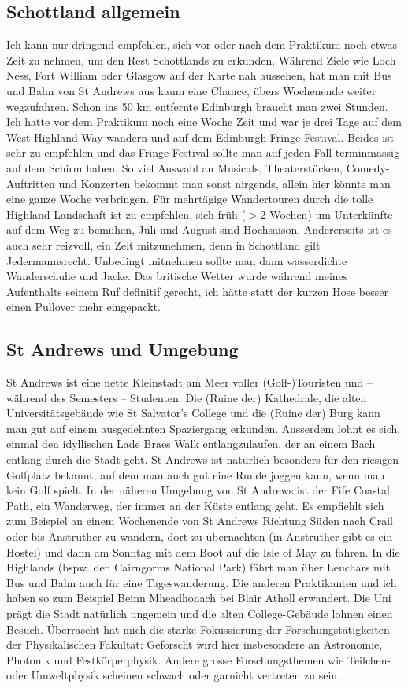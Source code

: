 \documentclass{article}
\begin{document}
\subsection{Schottland allgemein}
Ich kann nur dringend empfehlen, sich vor oder nach dem Praktikum noch etwas Zeit zu nehmen, um den Rest Schottlands zu erkunden. W\"{a}hrend Ziele wie Loch Ness, Fort William oder Glasgow auf der Karte nah aussehen, hat man mit Bus und Bahn von St Andrews aus kaum eine Chance, \"{u}bers Wochenende weiter wegzufahren. Schon ins 50 km entfernte Edinburgh braucht man zwei Stunden. Ich hatte vor dem Praktikum noch eine Woche Zeit und war je drei Tage auf dem West Highland Way wandern und auf dem Edinburgh Fringe Festival. Beides ist sehr zu empfehlen und das Fringe Festival sollte man auf jeden Fall terminm\"{a}ssig auf dem Schirm haben. So viel Auswahl an Musicals, Theaterst\"{u}cken, Comedy-Auftritten und Konzerten bekommt man sonst nirgends, allein hier k\"{o}nnte man eine ganze Woche verbringen. F\"{u}r mehrt\"{a}gige Wandertouren durch die tolle Highland-Landschaft ist zu empfehlen, sich fr\"{u}h ($>$2 Wochen) um Unterk\"{u}nfte auf dem Weg zu bem\"{u}hen, Juli und August sind Hochsaison. Andererseits ist es auch sehr reizvoll, ein Zelt mitzunehmen, denn in Schottland gilt Jedermannsrecht. Unbedingt mitnehmen sollte man dann wasserdichte Wanderschuhe und Jacke. Das britische Wetter wurde w\"{a}hrend meines Aufenthalts seinem Ruf definitif gerecht, ich h\"{a}tte statt der kurzen Hose besser einen Pullover mehr eingepackt.
\subsection{St Andrews und Umgebung}
St Andrews ist eine nette Kleinstadt am Meer voller (Golf-)Touristen und -- w\"{a}hrend des Semesters -- Studenten. Die (Ruine der) Kathedrale, die alten Universit\"{a}tsgeb\"{a}ude wie St Salvator's College und die (Ruine der) Burg kann man gut auf einem ausgedehnten Spaziergang erkunden. Ausserdem lohnt es sich, einmal den idyllischen Lade Braes Walk entlangzulaufen, der an einem Bach entlang durch die Stadt geht. St Andrews ist nat\"{u}rlich besonders f\"{u}r den riesigen Golfplatz bekannt, auf dem man auch gut eine Runde joggen kann, wenn man kein Golf spielt. In der n\"{a}heren Umgebung von St Andrews ist der Fife Coastal Path, ein Wanderweg, der immer an der K\"{u}ste entlang geht. Es empfiehlt sich zum Beispiel an einem Wochenende von St Andrews Richtung S\"{u}den nach Crail oder bis Anstruther zu wandern, dort zu \"{u}bernachten (in Anstruther gibt es ein Hostel) und dann am Sonntag mit dem Boot auf die Isle of May zu fahren. In die Highlands (bspw. den Cairngorms National Park) f\"{a}hrt man \"{u}ber Leuchars mit Bus und Bahn auch f\"{u}r eine Tageswanderung. Die anderen Praktikanten und ich haben so zum Beispiel Beinn Mheadhonach bei Blair Atholl erwandert. Die Uni pr\"{a}gt die Stadt nat\"{u}rlich ungemein und die alten College-Geb\"{a}ude lohnen einen Besuch. \"{U}berrascht hat mich die starke Fokussierung der Forschungst\"{a}tigkeiten der Physikalischen Fakult\"{a}t: Geforscht wird hier insbesondere an Astronomie, Photonik und Festk\"{o}rperphysik. Andere grosse Forschungsthemen wie Teilchen- oder Umweltphysik scheinen schwach oder garnicht vertreten zu sein.
\end{document}
